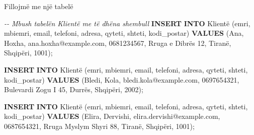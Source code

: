 \documentclass[
  ignorenonframetext,
]{beamer}
\newenvironment{Shaded}{\begin{snugshade}}{\end{snugshade}}
\newcommand{\CommentTok}[1]{\textcolor[rgb]{0.56,0.35,0.01}{\textit{#1}}}
\newcommand{\KeywordTok}[1]{\textcolor[rgb]{0.13,0.29,0.53}{\textbf{#1}}}
\newcommand{\NormalTok}[1]{#1}
\newcommand{\StringTok}[1]{\textcolor[rgb]{0.31,0.60,0.02}{#1}}
\begin{document}
\begin{frame}[fragile]{Fillojmë me një tabelë}
\label{fillojmuxeb-me-njuxeb-tabeluxeb-5}

\begin{Shaded}
\begin{Highlighting}[]
\CommentTok{{-}{-} Mbush tabelën Klientë me të dhëna shembull}
\KeywordTok{INSERT} \KeywordTok{INTO}\NormalTok{ Klientë (emri, mbiemri, email, telefoni, adresa, qyteti, shteti, kodi\_postar)}
\KeywordTok{VALUES}\NormalTok{ (}\StringTok{\textquotesingle{}Ana\textquotesingle{}}\NormalTok{, }\StringTok{\textquotesingle{}Hoxha\textquotesingle{}}\NormalTok{, }\StringTok{\textquotesingle{}ana.hoxha@example.com\textquotesingle{}}\NormalTok{, }\StringTok{\textquotesingle{}0681234567\textquotesingle{}}\NormalTok{, }\StringTok{\textquotesingle{}Rruga e Dibrës 12\textquotesingle{}}\NormalTok{, }\StringTok{\textquotesingle{}Tiranë\textquotesingle{}}\NormalTok{, }\StringTok{\textquotesingle{}Shqipëri\textquotesingle{}}\NormalTok{, }\StringTok{\textquotesingle{}1001\textquotesingle{}}\NormalTok{);}

\KeywordTok{INSERT} \KeywordTok{INTO}\NormalTok{ Klientë (emri, mbiemri, email, telefoni, adresa, qyteti, shteti, kodi\_postar)}
\KeywordTok{VALUES}\NormalTok{ (}\StringTok{\textquotesingle{}Bledi\textquotesingle{}}\NormalTok{, }\StringTok{\textquotesingle{}Kola\textquotesingle{}}\NormalTok{, }\StringTok{\textquotesingle{}bledi.kola@example.com\textquotesingle{}}\NormalTok{, }\StringTok{\textquotesingle{}0697654321\textquotesingle{}}\NormalTok{, }\StringTok{\textquotesingle{}Bulevardi Zogu I 45\textquotesingle{}}\NormalTok{, }\StringTok{\textquotesingle{}Durrës\textquotesingle{}}\NormalTok{, }\StringTok{\textquotesingle{}Shqipëri\textquotesingle{}}\NormalTok{, }\StringTok{\textquotesingle{}2002\textquotesingle{}}\NormalTok{);}

\KeywordTok{INSERT} \KeywordTok{INTO}\NormalTok{ Klientë (emri, mbiemri, email, telefoni, adresa, qyteti, shteti, kodi\_postar)}
\KeywordTok{VALUES}\NormalTok{ (}\StringTok{\textquotesingle{}Elira\textquotesingle{}}\NormalTok{, }\StringTok{\textquotesingle{}Dervishi\textquotesingle{}}\NormalTok{, }\StringTok{\textquotesingle{}elira.dervishi@example.com\textquotesingle{}}\NormalTok{, }\StringTok{\textquotesingle{}0687654321\textquotesingle{}}\NormalTok{, }\StringTok{\textquotesingle{}Rruga Myslym Shyri 88\textquotesingle{}}\NormalTok{, }\StringTok{\textquotesingle{}Tiranë\textquotesingle{}}\NormalTok{, }\StringTok{\textquotesingle{}Shqipëri\textquotesingle{}}\NormalTok{, }\StringTok{\textquotesingle{}1001\textquotesingle{}}\NormalTok{);}


\end{Highlighting}
\end{Shaded}
\end{frame}
\end{document}
